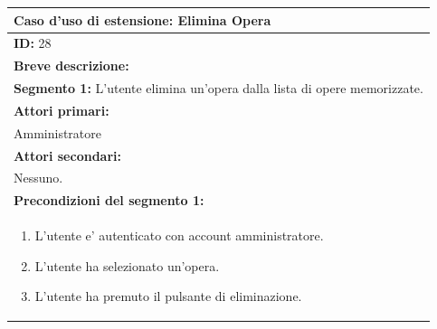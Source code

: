 \documentclass{article}
\begin{document}
                \begin{table}[H]
                    \begin{tabular}{|p{\linewidth}|}
                        \hline
                        \cellcolor{gray!100}
                        \color{white}
                        \centerline{\textbf{Caso d'uso di estensione:} Elimina Opera} \\
                        \hline
                        \textbf{ID:} 28 \\
                        \hline
                        \cellcolor{gray!20}
                        \textbf{Breve descrizione:} \\
                        \cellcolor{gray!20}
                        \textbf{Segmento 1:} L'utente elimina un'opera dalla lista di opere memorizzate. \\
                        \hline
                        \textbf{Attori primari:} \\
                        \begin{minipage}{\linewidth}
                            Amministratore
                        \end{minipage}
                        \vspace{-10pt} \\  %
                        \hline
                        \textbf{Attori secondari:} \\
                        Nessuno. \\
                        \hline
                        \cellcolor{gray!20}
                        \textbf{Precondizioni del segmento 1:} \\
                        \cellcolor{gray!20}
                        \begin{minipage}{\linewidth}
                            \begin{enumerate}
                                \item L'utente e' autenticato con account amministratore.
                                \item L'utente ha selezionato un'opera.
                                \item L'utente ha premuto il pulsante di eliminazione.
                            \end{enumerate}
                        \end{minipage} \\

\end{tabular}
\end{table}
\end{document}
